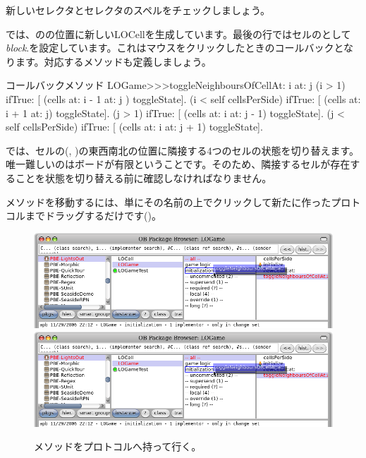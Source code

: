 \documentclass[a4paper,10pt,twoside]{book}
\begin{document}

新しいセレクタとセレクタのスペルをチェックしましょう。

 では、のの位置に新しいLOCellを生成しています。最後の行ではセルのとして\emph{block}\mbox{.}を設定しています。これはマウスをクリックしたときのコールバックとなります。対応するメソッドも定義しましょう。

\begin{method}[toggleNeighboursOfCellAt:at:]{コールバックメソッド}
LOGame>>>toggleNeighboursOfCellAt: i at: j
   (i > 1) ifTrue: [ (cells at: i - 1 at: j ) toggleState].
   (i < self cellsPerSide) ifTrue: [ (cells at: i + 1 at: j) toggleState].
   (j > 1) ifTrue: [ (cells at: i  at: j - 1) toggleState].
   (j < self cellsPerSide) ifTrue: [ (cells at: i at: j + 1) toggleState].
\end{method}

 では、セルの(, )の東西南北の位置に隣接する4つのセルの状態を切り替えます。唯一難しいのはボードが有限ということです。そのため、隣接するセルが存在することを状態を切り替える前に確認しなければなりません。


メソッドを移動するには、単にその名前の上でクリックして新たに作ったプロトコルまでドラッグするだけです()。

\begin{figure}[htbp]
   \centering
   \ifluluelse
		{\includegraphics[width=\textwidth]{DragMethod} }
		{\includegraphics[scale=0.7]{DragMethod} }
   \caption{メソッドをプロトコルへ持って行く。}
\end{figure}
\end{document}
